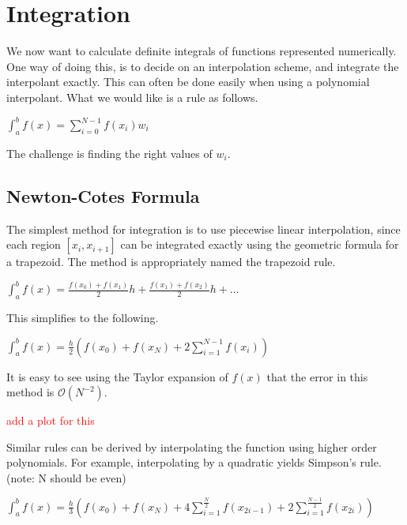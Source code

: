 \documentclass[12pt,letterpaper]{article}
\begin{document}
\newpage
\section{Integration}
We now want to calculate definite integrals of functions represented numerically. One way of doing this, is to decide on an interpolation scheme, and integrate the interpolant exactly. This can often be done easily when using a polynomial interpolant. What we would like is a rule as follows.

\begin{center}
$\int_{a}^{b}f(x) = \sum_{i=0}^{N-1}f(x_i)w_i$
\end{center}

The challenge is finding the right values of $w_i$.

\subsection{Newton-Cotes Formula}
The simplest method for integration is to use piecewise linear interpolation, since each region $[x_i,x_{i+1}]$ can be integrated exactly using the geometric formula for a trapezoid. The method is appropriately named the trapezoid rule.

\begin{center}
$\int_{a}^{b}f(x) = \frac{f(x_0)+f(x_1)}{2}h + \frac{f(x_1)+f(x_2)}{2}h + \dots$
\end{center}

This simplifies to the following.

\begin{center}
$\int_{a}^{b}f(x) = \frac{h}{2}(f(x_0)+f(x_N) + 2\sum_{i=1}^{N-1}f(x_i))$
\end{center}

It is easy to see using the Taylor expansion of $f(x)$ that the error in this method is $\mathcal{O}(N^{-2})$.

\begin{center}
\textcolor{red}{add a plot for this}
\end{center}

Similar rules can be derived by interpolating the function using higher order polynomials. For example, interpolating by a quadratic yields Simpson's rule. (note: N should be even)

\begin{center}
$\int_{a}^{b}f(x) = \frac{h}{3}(f(x_0)+f(x_N) + 4\sum_{i=1}^{\frac{N}{2}}f(x_{2i-1}) + 2\sum_{i=1}^{\frac{N - 1}{2}}f(x_{2i}))$
\end{center}
\end{document}
